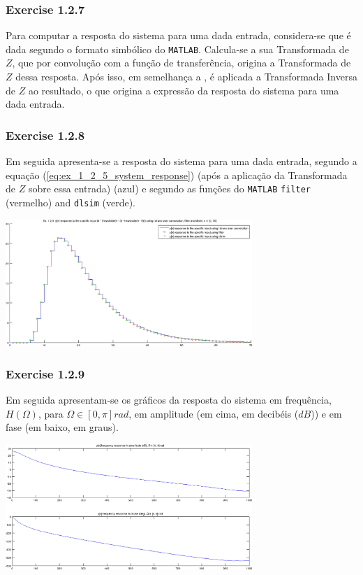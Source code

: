 \documentclass[a4paper]{article}
\begin{document}
\subsubsection{Exercise 1.2.7}
\noindent Para computar a resposta do sistema para uma dada entrada, considera-se que é dada segundo o formato simbólico do \texttt{MATLAB}. Calcula-se a sua Transformada de $Z$, que por convolução com a função de transferência, origina a Transformada de $Z$ dessa resposta. Após isso, em semelhança a , é aplicada a Transformada Inversa de $Z$ ao resultado, o que origina a expressão da resposta do sistema para uma dada entrada.

\clearpage
\subsubsection{Exercise 1.2.8}
\noindent Em seguida apresenta-se a resposta do sistema para uma dada entrada, segundo a equação (\ref{eq:ex_1_2_5_system_response}) (após a aplicação da Transformada de $Z$ sobre essa entrada) (azul) e segundo as funções do \texttt{MATLAB} \texttt{filter} (vermelho) and \texttt{dlsim} (verde).
\begin{center}
	\includegraphics[width=0.70\textwidth]{images/ex1_2_8.png}
	\label{fig:ex1_2_8}
\end{center}

\subsubsection{Exercise 1.2.9}
\noindent Em seguida apresentam-se os gráficos da resposta do sistema em frequência, $H(\Omega)$, para $\Omega \in [0, \pi] rad$, em amplitude (em cima, em decibéis ($dB$)) e em fase (em baixo, em graus).
\begin{center}
	\includegraphics[width=0.70\textwidth]{images/ex1_2_9.png}
	\label{fig:ex1_2_9}
\end{center}
\end{document}
